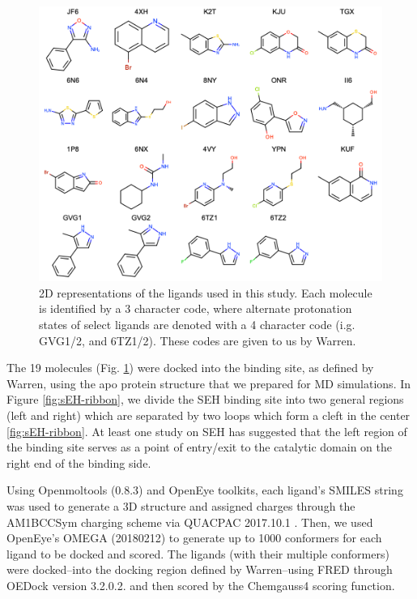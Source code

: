 \begin{figure}
    \centering
    \includegraphics{chapter5/Figures/2d-molecules.png}
    \caption[SEH 2D Ligand Representation]{2D representations of the ligands used in this study. Each molecule is identified by a 3 character code, where alternate protonation states of select ligands are denoted with a 4 character code (i.g. GVG1/2, and 6TZ1/2). These codes are given to us by Warren.}
    \label{fig:2D-molecules}
\end{figure}

The 19 molecules (Fig. \ref{fig:2D-molecules}) were docked into the binding site, as defined by Warren, using the apo protein structure that we prepared for MD simulations.
In Figure \ref{fig:sEH-ribbon}, we divide the SEH binding site into two general regions (left and right) which are separated by two loops which form a cleft in the center \ref{fig:sEH-ribbon}.
At least one study on SEH has suggested that the left region of the binding site serves as a point of entry/exit to the catalytic domain on the right end of the binding side\cite{lotz_unbiased_2018}.

Using Openmoltools (0.8.3)\cite{eastman_openmm_2017} and OpenEye toolkits, each ligand's SMILES string was used to generate a 3D structure and assigned charges through the AM1BCCSym charging scheme via QUACPAC 2017.10.1 \cite{jakalian_fast_2002}. 
Then, we used OpenEye's OMEGA (20180212) to generate up to 1000 conformers for each ligand to be docked and scored\cite{hawkins_conformer_2010}.
The ligands (with their multiple conformers) were docked--into the docking region defined by Warren--using FRED through OEDock version 3.2.0.2. and then scored by the Chemgauss4 scoring function\cite{mcgann_fred_2011}.


